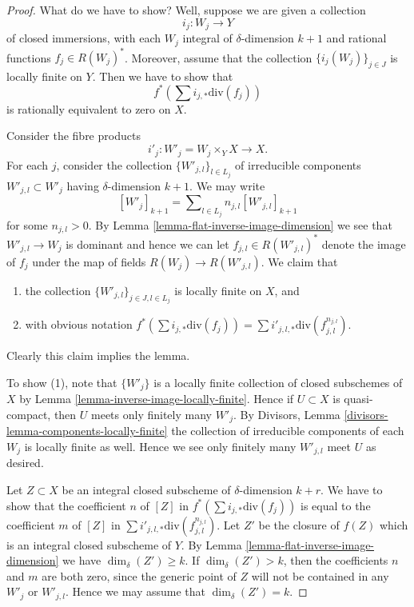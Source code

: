 \begin{proof}
What do we have to show? Well, suppose we are given a collection
$$
i_j : W_j \longrightarrow Y
$$
of closed immersions, with each $W_j$ integral of $\delta$-dimension $k + 1$
and rational functions $f_j \in R(W_j)^*$.
Moreover, assume that
the collection $\{i_j(W_j)\}_{j \in J}$ is locally finite on $Y$.
Then we have to show that
$$
f^*(\sum i_{j, *}\text{div}(f_j))
$$
is rationally equivalent to zero on $X$.

\medskip\noindent
Consider the fibre products
$$
i'_j :
W'_j = W_j \times_Y X
\longrightarrow
X.
$$
For each $j$, consider the collection $\{W'_{j, l}\}_{l \in L_j}$
of irreducible components $W'_{j, l} \subset W'_j$ having $\delta$-dimension
$k + 1$. We may write
$$
[W'_j]_{k + 1} = \sum\nolimits_{l \in L_j} n_{j, l}[W'_{j, l}]_{k + 1}
$$
for some $n_{j, l} > 0$.
By Lemma \ref{lemma-flat-inverse-image-dimension}
we see that $W'_{j, l} \to W_j$ is
dominant and hence we can let $f_{j, l} \in R(W'_{j, l})^*$ denote the
image of $f_j$ under the map of fields $R(W_j) \to R(W'_{j, l})$.
We claim that
\begin{enumerate}
\item the collection $\{W'_{j, l}\}_{j \in J, l \in L_j}$ is
locally finite on $X$, and
\item with obvious notation
$f^*(\sum i_{j, *}\text{div}(f_j))
=
\sum i'_{j, l, *} \text{div}(f_{j, l}^{n_{j, l}})$.
\end{enumerate}
Clearly this claim implies the lemma.

\medskip\noindent
To show (1), note that $\{W'_j\}$ is a locally finite collection
of closed subschemes of $X$ by Lemma \ref{lemma-inverse-image-locally-finite}.
Hence if $U \subset X$ is quasi-compact, then $U$ meets only finitely
many $W'_j$. By Divisors, Lemma \ref{divisors-lemma-components-locally-finite}
the collection of
irreducible components of each $W_j$ is locally finite as well. Hence
we see only finitely many $W'_{j, l}$ meet $U$ as desired.

\medskip\noindent
Let $Z \subset X$ be an integral closed subscheme of $\delta$-dimension
$k + r$. We have to show that the coefficient $n$ of $[Z]$ in
$f^*(\sum i_{j, *}\text{div}(f_j))$ is equal to the coefficient
$m$ of $[Z]$ in $\sum i'_{j, l, *} \text{div}(f_{j, l}^{n_{j, l}})$.
Let $Z'$ be the closure of $f(Z)$ which is an integral closed
subscheme of $Y$. By Lemma \ref{lemma-flat-inverse-image-dimension}
we have $\dim_\delta(Z') \geq k$.
If $\dim_\delta(Z') > k$, then the coefficients $n$ and $m$ are
both zero, since the generic point of $Z$ will not be contained
in any $W'_j$ or $W'_{j, l}$. Hence we may assume that $\dim_\delta(Z') = k$.


\end{proof}
